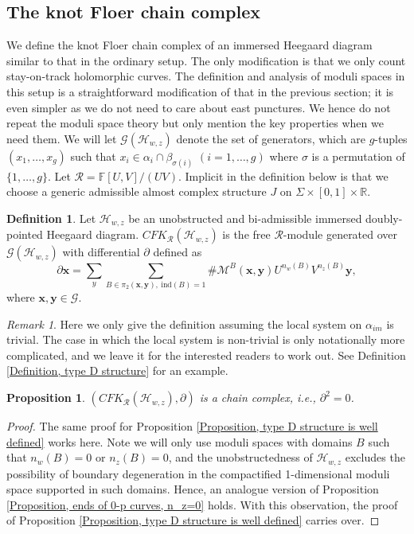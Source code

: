 \documentclass{amsart}
\newtheorem{prop}[thm]{Proposition}
\theoremstyle{definition}
\newtheorem{defn}[thm]{Definition}
\theoremstyle{remark}
\newtheorem{rmk}[thm]{Remark}
\numberwithin{equation}{section}
\numberwithin{equation}{section} \makeatletter
\begin{document}
\subsection{The knot Floer chain complex}
We define the knot Floer chain complex of an immersed Heegaard diagram similar to that in the ordinary setup. The only modification is that we only count stay-on-track holomorphic curves. The definition and analysis of moduli spaces in this setup is a straightforward modification of that in the previous section; it is even simpler as we do not need to care about east punctures. We hence do not repeat the moduli space theory but only mention the key properties when we need them. We will let $\mathcal{G}(\mathcal{H}_{w,z})$ denote the set of generators, which are $g$-tuples $(x_1,\ldots,x_g)$ such that $x_i\in \alpha_i\cap \beta_{\sigma(i)}$ $(i=1,\ldots,g)$ where $\sigma$ is a permutation of $\{1,\ldots,g\}$. Let $\mathcal{R}=\mathbb{F}[U,V]/(UV)$. Implicit in the definition below is that we choose a generic admissible almost complex structure $J$ on $\Sigma\times[0,1]\times \mathbb{R}$.
\begin{defn}\label{Definition, CFK_R}
Let $\mathcal{H}_{w,z}$ be an unobstructed and bi-admissible immersed doubly-pointed Heegaard diagram. $CFK_{\mathcal{R}}(\mathcal{H}_{w,z})$ is the free $\mathcal{R}$-module generated over $\mathcal{G}(\mathcal{H}_{w,z})$ with differential $\partial$ defined as $$\partial \bm{x} =\sum_{y}\sum_{B\in\pi_2(\bm{x},\bm{y}),\ \text{ind}(B)=1} \#\mathcal{M}^B(\bm{x},\bm{y})U^{n_w(B)}V^{n_z(B)}\bm{y},$$
where $\bm{x},\bm{y}\in\mathcal{G}$.  
\end{defn}  
\begin{rmk}
Here we only give the definition assuming the local system on $\alpha_{im}$ is trivial. The case in which the local system is non-trivial is only notationally more complicated, and we leave it for the interested readers to work out. See Definition \ref{Definition, type D structure} for an example.    
\end{rmk}
\begin{prop}\label{Proposition, well-definess of partial for CFK_R}
$(CFK_\mathcal{R}(\mathcal{H}_{w,z}),\partial)$ is a chain complex, i.e., $\partial^2=0$.
\end{prop}
\begin{proof}
The same proof for Proposition \ref{Proposition, type D structure is well defined} works here. Note we will only use moduli spaces with domains $B$ such that $n_w(B)=0$ or $n_z(B)=0$, and the unobstructedness of $\mathcal{H}_{w,z}$ excludes the possibility of boundary degeneration in the compactified 1-dimensional moduli space supported in such domains. Hence, an analogue version of Proposition \ref{Proposition, ends of 0-p curves, n_z=0} holds. With this observation, the proof of Proposition \ref{Proposition, type D structure is well defined} carries over.  
\end{proof}
\end{document}
